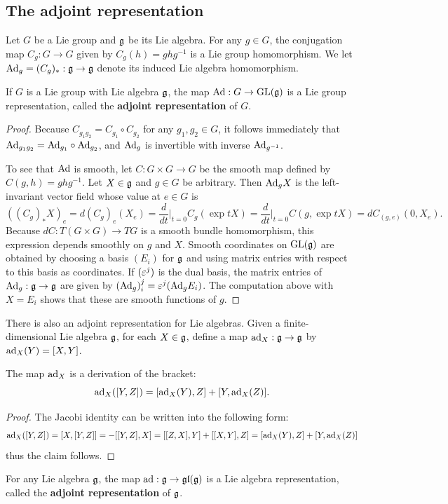 \subsection{The adjoint representation}
Let $G$ be a Lie group and $\mathfrak{g}$ be its Lie algebra. For any $g\in G$, the conjugation map $C_g:G\to G$ given by $C_g(h)=ghg^{-1}$ is a Lie group homomorphism. We let $\mathrm{Ad}_g=(C_g)_*:\mathfrak{g}\to\mathfrak{g}$ denote its induced Lie algebra homomorphism.
\begin{proposition}
If $G$ is a Lie group with Lie algebra $\mathfrak{g}$, the map $\mathrm{Ad}:G\to\mathrm{GL}(\mathfrak{g})$ is a Lie group representation, called the \textbf{adjoint representation} of $G$.
\end{proposition}
\begin{proof}
Because $C_{g_1g_2}=C_{g_1}\circ C_{g_2}$ for any $g_1,g_2\in G$, it follows immediately that $\mathrm{Ad}_{g_1g_2}=\mathrm{Ad}_{g_1}\circ\mathrm{Ad}_{g_2}$, and $\mathrm{Ad}_g$ is invertible with inverse $\mathrm{Ad}_{g^{-1}}$.\par
To see that $\mathrm{Ad}$ is smooth, let $C:G\times G\to G$ be the smooth map defined by $C(g,h)=ghg^{-1}$. Let $X\in\mathfrak{g}$ and $g\in G$ be arbitrary. Then $\mathrm{Ad}_gX$ is the left-invariant vector field whose value at $e\in G$ is
\[((C_g)_*X)_e=d(C_g)_e(X_e)=\frac{d}{dt}\Big|_{t=0}C_g(\exp tX)=\frac{d}{dt}\Big|_{t=0}C(g,\exp tX)=dC_{(g,e)}(0,X_e).\]
Because $dC:T(G\times G)\to TG$ is a smooth bundle homomorphism, this expression depends smoothly on $g$ and $X$. Smooth coordinates on $\mathrm{GL}(\mathfrak{g})$ are obtained by choosing a basis $(E_i)$ for $\mathfrak{g}$ and using matrix entries 
with respect to this basis as coordinates. If $(\varepsilon^j)$ is the dual basis, the matrix entries of $\mathrm{Ad}_g:\mathfrak{g}\to\mathfrak{g}$ are given by $(\mathrm{Ad}_g)_i^j=\varepsilon^j(\mathrm{Ad}_gE_i)$. The computation above
with $X=E_i$ shows that these are smooth functions of $g$.
\end{proof}
There is also an adjoint representation for Lie algebras. Given a finite-dimensional Lie algebra $\mathfrak{g}$, for each $X\in\mathfrak{g}$, define a map $\mathrm{ad}_X:\mathfrak{g}\to\mathfrak{g}$ by $\mathrm{ad}_X(Y)=[X,Y]$.
\begin{proposition}
The map $\mathrm{ad}_X$ is a derivation of the bracket:
\[\mathrm{ad}_X([Y,Z])=[\mathrm{ad}_X(Y),Z]+[Y,\mathrm{ad}_X(Z)].\]
\end{proposition}
\begin{proof}
The Jacobi identity can be written into the following form:
\[\mathrm{ad}_X([Y,Z])=[X,[Y,Z]]=-[[Y,Z],X]=[[Z,X],Y]+[[X,Y],Z]=[\mathrm{ad}_X(Y),Z]+[Y,\mathrm{ad}_X(Z)]\]
thus the claim follows.
\end{proof}
\begin{proposition}
For any Lie algebra $\mathfrak{g}$, the map $\mathrm{ad}:\mathfrak{g}\to\mathfrak{gl}(\mathfrak{g})$ is a Lie algebra representation, called the \textbf{adjoint representation} of $\mathfrak{g}$.
\end{proposition}
